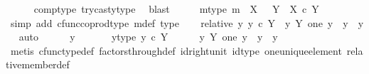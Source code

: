 \begin{isabellebody}
\ \ \ \ \isamarkupfalse%
\ comp{\isacharunderscore}{\kern0pt}type\ trycast{\isacharunderscore}{\kern0pt}y{}{\isacharunderscore}{\kern0pt}type\ \isamarkupfalse%
\ blast\isanewline
\ \ \isamarkupfalse%
\ \isamarkupfalse%
\ m{\isacharunderscore}{\kern0pt}type{\isacharcolon}{\kern0pt}\ {\isachardoublequoteopen}m\ {\isacharcolon}{\kern0pt}\ X\ \ {\isasymCoprod}\ Y\ {\isasymrightarrow}\ {\isacharparenleft}{\kern0pt}X\ {\isasymtimes}\isactrlsub c\ Y{\isacharparenright}{\kern0pt}{\isachardoublequoteclose}\isanewline
\ \ \ \ \isamarkupfalse%
\ {\isacharparenleft}{\kern0pt}simp\ add{\isacharcolon}{\kern0pt}\ cfunc{\isacharunderscore}{\kern0pt}coprod{\isacharunderscore}{\kern0pt}type\ m{\isacharunderscore}{\kern0pt}def\ type{}{\isacharparenright}{\kern0pt}\isanewline
\isanewline
\ \ \isamarkupfalse%
\ relative{\isacharcolon}{\kern0pt}\ {\isachardoublequoteopen}{\isasymAnd}y{\isachardot}{\kern0pt}\ y\ {\isasymin}\isactrlsub c\ Y\ {\isasymLongrightarrow}\ {\isacharparenleft}{\kern0pt}y\ {\isasymin}\isactrlbsub Y\isactrlesub \ {\isacharparenleft}{\kern0pt}one{\isacharcomma}{\kern0pt}\ y{}{\isacharparenright}{\kern0pt}{\isacharparenright}{\kern0pt}\ {\isacharequal}{\kern0pt}\ {\isacharparenleft}{\kern0pt}y\ {\isacharequal}{\kern0pt}\ y{}{\isacharparenright}{\kern0pt}{\isachardoublequoteclose}\isanewline
\ \ \isamarkupfalse%
{\isacharparenleft}{\kern0pt}auto{\isacharparenright}{\kern0pt}\isanewline
\ \ \ \ \isamarkupfalse%
\ y\ \isanewline
\ \ \ \ \isamarkupfalse%
\ y{\isacharunderscore}{\kern0pt}type{\isacharcolon}{\kern0pt}\ {\isachardoublequoteopen}y\ {\isasymin}\isactrlsub c\ Y{\isachardoublequoteclose}\isanewline
\ \ \ \ \isamarkupfalse%
\ {\isachardoublequoteopen}y\ {\isasymin}\isactrlbsub Y\isactrlesub \ {\isacharparenleft}{\kern0pt}one{\isacharcomma}{\kern0pt}\ y{}{\isacharparenright}{\kern0pt}\ {\isasymLongrightarrow}\ y\ {\isacharequal}{\kern0pt}\ y{}{\isachardoublequoteclose}\isanewline
\ \ \ \ \ \ \isamarkupfalse%
\ {\isacharparenleft}{\kern0pt}metis\ cfunc{\isacharunderscore}{\kern0pt}type{\isacharunderscore}{\kern0pt}def\ factors{\isacharunderscore}{\kern0pt}through{\isacharunderscore}{\kern0pt}def\ id{\isacharunderscore}{\kern0pt}right{\isacharunderscore}{\kern0pt}unit{}\ id{\isacharunderscore}{\kern0pt}type\ one{\isacharunderscore}{\kern0pt}unique{\isacharunderscore}{\kern0pt}element\ relative{\isacharunderscore}{\kern0pt}member{\isacharunderscore}{\kern0pt}def{}{\isacharparenright}{\kern0pt}\isanewline

\end{isabellebody}
